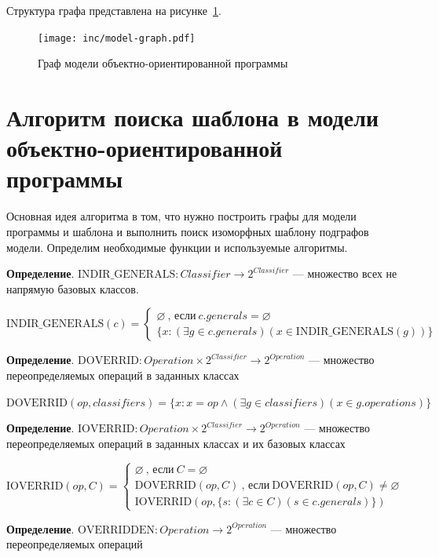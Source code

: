 Структура графа представлена на рисунке~\ref{fig:model-graph}.

\begin{figure}[!ht]
\centering
\texttt{[image: inc/model-graph.pdf]}
\caption{Граф модели объектно-ориентированной программы}
\label{fig:model-graph}
\end{figure}

\section{Алгоритм поиска шаблона в модели объектно-ориентированной программы}

Основная идея алгоритма в том, что нужно построить графы для модели программы
и шаблона и выполнить поиск изоморфных шаблону подграфов модели.
Определим необходимые функции и используемые алгоритмы.

\textbf{Определение}. $\textrm{INDIR\_GENERALS}: Classifier \to 2^{Classifier}$
--- множество всех не напрямую базовых классов.

$\textrm{INDIR\_GENERALS}(c) = \begin{cases}
\varnothing \ \textrm{, если} \ c.generals = \varnothing \\
\{ x : (\exists g \in c.generals)(x \in \textrm{INDIR\_GENERALS}(g)) \}
\end{cases}
$

\textbf{Определение}. $\textrm{DOVERRID}: Operation \times 2^{Classifier} \to 2^{Operation}$
--- множество переопределяемых операций в заданных классах

$\textrm{DOVERRID}(op, classifiers) = \{ x : x = op \land (\exists g \in classifiers)(x \in g.operations) \}$

\textbf{Определение}. $\textrm{IOVERRID}: Operation \times 2^{Classifier} \to 2^{Operation}$
--- множество переопределяемых операций в заданных классах и их базовых классах

$\textrm{IOVERRID}(op, C) = \begin{cases}
\varnothing \ \textrm{, если} \ C = \varnothing \\
\textrm{DOVERRID}(op, C) \ \textrm{, если} \ \textrm{DOVERRID}(op, C) \ne \varnothing \\
\textrm{IOVERRID}(op, \{ s : (\exists c \in C)(s \in c.generals) \})
\end{cases}
$

\textbf{Определение}. $\textrm{OVERRIDDEN}: Operation \to 2^{Operation}$
--- множество переопределяемых операций

